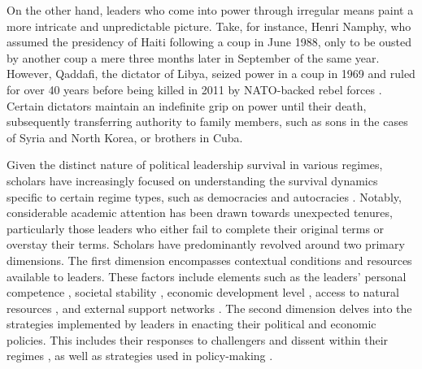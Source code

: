 \documentclass[
  12pt,
  a4paper,
  12pt]{article}
\begin{document}
On the other hand, leaders who come into power through irregular means
paint a more intricate and unpredictable picture. Take, for instance,
Henri Namphy, who assumed the presidency of Haiti following a coup in
June 1988, only to be ousted by another coup a mere three months later
in September of the same year. However, Qaddafi, the dictator of Libya,
seized power in a coup in 1969 and ruled for over 40 years before being
killed in 2011 by NATO-backed rebel forces \citep{goemans2009}. Certain
dictators maintain an indefinite grip on power until their death,
subsequently transferring authority to family members, such as sons in
the cases of Syria and North Korea, or brothers in Cuba.

Given the distinct nature of political leadership survival in various
regimes, scholars have increasingly focused on understanding the
survival dynamics specific to certain regime types, such as democracies
\citep{svolik2014} and autocracies \citep{davenport2021}. Notably,
considerable academic attention has been drawn towards unexpected
tenures, particularly those leaders who either fail to complete their
original terms or overstay their terms. Scholars have predominantly
revolved around two primary dimensions. The first dimension encompasses
contextual conditions and resources available to leaders. These factors
include elements such as the leaders' personal competence
\citep{yu2016}, societal stability \citep{arriola2009}, economic
development level \citep{palmer1999, williams2011}, access to natural
resources \citep{smith2004, quirozflores2012}, and external support
networks \citep{licht2009, wright2008, thyne2017}. The second dimension
delves into the strategies implemented by leaders in enacting their
political and economic policies. This includes their responses to
challengers and dissent within their regimes
\citep{escribà-folch2013, davenport2021}, as well as strategies used in
policy-making \citep{gandhi2007, morrison2009}.
\end{document}
